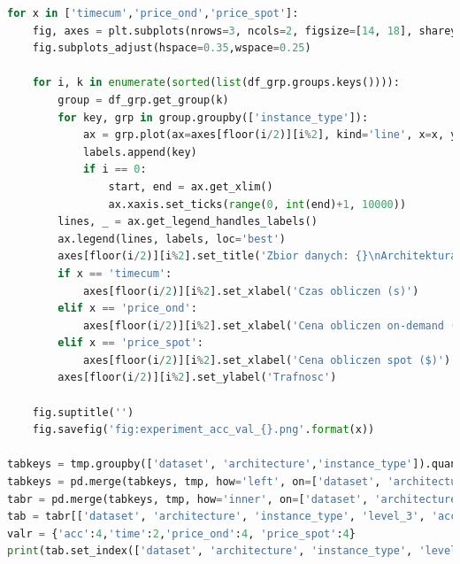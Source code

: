 \documentclass[12pt,a4paper,twoside]{article}
\begin{document}
\begin{appendices}
\begin{lstlisting}[language=python]
for x in ['timecum','price_ond','price_spot']:
    fig, axes = plt.subplots(nrows=3, ncols=2, figsize=[14, 18], sharey=False)
    fig.subplots_adjust(hspace=0.35,wspace=0.25)

    for i, k in enumerate(sorted(list(df_grp.groups.keys()))):
        group = df_grp.get_group(k)
        for key, grp in group.groupby(['instance_type']):
            ax = grp.plot(ax=axes[floor(i/2)][i%2], kind='line', x=x, y='val_acc', c='black', ls=lsd.get(key))
            labels.append(key)
            if i == 0:
                start, end = ax.get_xlim()
                ax.xaxis.set_ticks(range(0, int(end)+1, 10000))
        lines, _ = ax.get_legend_handles_labels()
        ax.legend(lines, labels, loc='best')
        axes[floor(i/2)][i%2].set_title('Zbior danych: {}\nArchitektura: {}'.format(k.split('_')[0], k.split('_')[1]))
        if x == 'timecum':
            axes[floor(i/2)][i%2].set_xlabel('Czas obliczen (s)')
        elif x == 'price_ond':
            axes[floor(i/2)][i%2].set_xlabel('Cena obliczen on-demand ($)')
        elif x == 'price_spot':
            axes[floor(i/2)][i%2].set_xlabel('Cena obliczen spot ($)')
        axes[floor(i/2)][i%2].set_ylabel('Trafnosc')

    fig.suptitle('')
    fig.savefig('fig:experiment_acc_val_{}.png'.format(x))

tabkeys = tmp.groupby(['dataset', 'architecture','instance_type']).quantile([0.1, 0.25, 0.5, 0.75, 0.9], interpolation='nearest')['acc'].reset_index()
tabkeys = pd.merge(tabkeys, tmp, how='left', on=['dataset', 'architecture', 'instance_type', 'acc']).groupby(['dataset', 'architecture', 'instance_type', 'acc', 'level_3']).min()['index'].reset_index()
tabr = pd.merge(tabkeys, tmp, how='inner', on=['dataset', 'architecture', 'instance_type', 'index'], suffixes=('_x',''))
tab = tabr[['dataset', 'architecture', 'instance_type', 'level_3', 'acc', 'time', 'price_ond', 'price_spot']]
valr = {'acc':4,'time':2,'price_ond':4, 'price_spot':4}
print(tab.set_index(['dataset', 'architecture', 'instance_type', 'level_3']).round(valr).to_latex())
\end{lstlisting}
\end{appendices}
\clearpage
\end{document}
